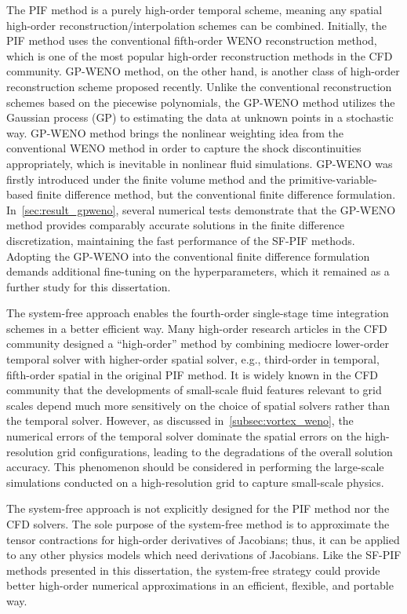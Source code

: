 The PIF method is a purely high-order temporal scheme,
meaning any spatial high-order reconstruction/interpolation schemes can be combined.
Initially, the PIF method uses the conventional fifth-order WENO reconstruction method,
which is one of the most popular high-order reconstruction methods in the CFD community.
GP-WENO method, on the other hand, is another class of high-order reconstruction scheme proposed recently.
Unlike the conventional reconstruction schemes based on the piecewise polynomials,
the GP-WENO method utilizes the Gaussian process (GP) to estimating the data at unknown points in a stochastic way.
GP-WENO method brings the nonlinear weighting idea from the conventional WENO method
in order to capture the shock discontinuities appropriately,
which is inevitable in nonlinear fluid simulations.
GP-WENO was firstly introduced under the finite volume method and
the primitive-variable-based finite difference method,
but the conventional finite difference formulation.
In~\cref{sec:result_gpweno}, several numerical tests demonstrate that
the GP-WENO method provides comparably accurate solutions in the finite difference discretization,
maintaining the fast performance of the SF-PIF methods.
Adopting the GP-WENO into the conventional finite difference formulation demands
additional fine-tuning on the hyperparameters,
which it remained as a further study for this dissertation.

The system-free approach enables the fourth-order single-stage time integration schemes in a better efficient way.
Many high-order research articles in the CFD community designed a ``high-order'' method
by combining mediocre lower-order temporal solver with higher-order spatial solver,
e.g., third-order in temporal, fifth-order spatial in the original PIF method.
It is widely known in the CFD community that the developments of small-scale fluid features
relevant to grid scales depend much more sensitively on the choice of spatial solvers
rather than the temporal solver.
However, as discussed in~\cref{subsec:vortex_weno}, the numerical errors of the temporal solver
dominate the spatial errors on the high-resolution grid configurations,
leading to the degradations of the overall solution accuracy.
This phenomenon should be considered in performing the large-scale simulations
conducted on a high-resolution grid to capture small-scale physics.

The system-free approach is not explicitly designed for the PIF method nor the CFD solvers.
The sole purpose of the system-free method is to approximate the tensor contractions
for high-order derivatives of Jacobians;
thus, it can be applied to any other physics models which need derivations of Jacobians.
Like the SF-PIF methods presented in this dissertation,
the system-free strategy could provide better high-order numerical approximations
in an efficient, flexible, and portable way.
